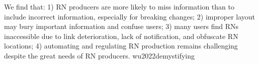 \documentclass{article}
\begin{document}
  {We find that: 1) RN producers are more likely to miss information than to include incorrect information, especially for breaking changes; 2) improper layout may bury important information and confuse users; 3) many users find RNs inaccessible due to link deterioration, lack of notification, and obfuscate RN locations; 4) automating and regulating RN production remains challenging despite the great needs of RN producers.}
  {wu2022demystifying}




\end{document}
